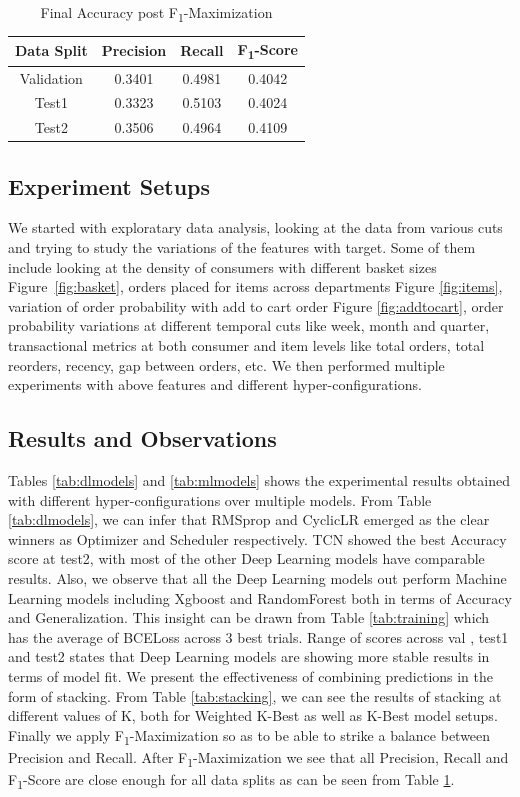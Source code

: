 \begin{table}[t]
\caption{Final Accuracy post F\textsubscript{1}-Maximization}
\vspace{0.1 in}
\centering
\resizebox{3.3in}{!}
{%
\begin{tabular}{|c|c|c|c|}
\hline
{\bf Data Split} & {\bf Precision} & {\bf Recall} & {\bf F\textsubscript{1}-Score} \\ 
\hline\hline 
Validation	  	 &  0.3401 &  0.4981 &  0.4042  \\ \hline
Test1	  		 &  0.3323 &  0.5103 &  0.4024  \\ \hline
Test2	  		 & 0.3506 &  0.4964 &  0.4109 \\ \hline
\end{tabular}
}
\label{tab:Fscore}
\end{table}

\subsection{Experiment Setups}
We started with exploratary data analysis, looking at the data from various cuts and 
trying to study the variations of the features with target. Some of them include looking at the 
density of consumers with different basket sizes Figure~\ref{fig:basket}, orders placed for items 
across departments Figure \ref{fig:items}, variation of order probability with add to cart order Figure \ref{fig:addtocart},
order probability variations at different temporal cuts like week, month and quarter, transactional metrics at both
consumer and item levels like total orders, total reorders, recency, gap between orders, etc.
We then performed multiple experiments with above features and different hyper-configurations.

\subsection{Results and Observations}
Tables \ref{tab:dlmodels} and \ref{tab:mlmodels} shows the experimental results obtained with different hyper-configurations over multiple models.
From Table \ref{tab:dlmodels}, we can infer that RMSprop and CyclicLR emerged as the clear winners as 
Optimizer and Scheduler respectively. TCN showed the best Accuracy score at test2, with most of the other Deep
Learning models have comparable results. Also, we observe that all the Deep Learning models out perform Machine Learning 
models including Xgboost and RandomForest both in terms of Accuracy and Generalization. This insight can be drawn from 
Table \ref{tab:training} which has the average of BCELoss across 3 best trials. Range of scores across val , test1 and test2 states 
that Deep Learning models are showing more stable results in terms of model fit. 
We present the effectiveness of combining predictions in the form of stacking. From Table \ref{tab:stacking}, we can see the 
results of stacking at different values of K, both for Weighted K-Best as well as K-Best model setups. Finally we 
apply F\textsubscript{1}-Maximization so as to be able to strike a balance between Precision and Recall.
After F\textsubscript{1}-Maximization we see that all Precision, Recall and F\textsubscript{1}-Score 
are close enough for all data splits as can be seen from Table \ref{tab:Fscore}.
